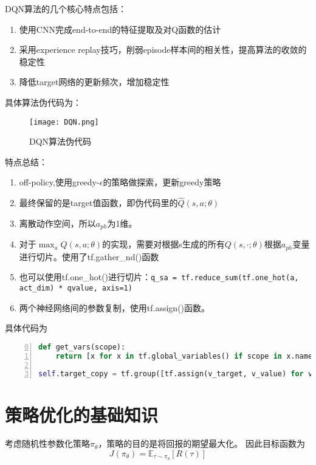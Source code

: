 DQN算法的几个核心特点包括：
\begin{enumerate}
    \item 使用CNN完成end-to-end的特征提取及对Q函数的估计
    \item 采用experience replay技巧，削弱episode样本间的相关性，提高算法的收敛的稳定性
    \item 降低target网络的更新频次，增加稳定性
\end{enumerate}

具体算法伪代码为：
\begin{figure}[htbp]
	\figskip 
	\centering
	\texttt{[image: DQN.png]}	  
	\caption{\label{fig: dqn} DQN算法伪代码}
\end{figure}

特点总结：
\begin{enumerate}
    \item off-policy,使用greedy-$\epsilon$的策略做探索，更新greedy策略
    \item 最终保留的是target值函数，即伪代码里的$\hat{Q}(s,a;\theta)$
    \item 离散动作空间，所以$a_{ph}$为1维。
    \item 对于$\max_a Q(s,a;\theta)$的实现，需要对根据s生成的所有$Q(s,\cdot;\theta)$根据$a_{ph}$变量进行切片。使用了tf.gather\_nd()函数
    \item 也可以使用tf.one_hot()进行切片：\texttt{q_sa = tf.reduce_sum(tf.one_hot(a, act_dim) * qvalue, axis=1)}
    \item 两个神经网络间的参数复制，使用tf.assign()函数。
\end{enumerate}

具体代码为
\begin{lstlisting}[language=python,numbers=left,firstnumber = 0,numberstyle=\tiny,breaklines = true,keywordstyle=\color{blue!70},commentstyle=\color{red!50!green!50!blue!50},frame=shadowbox, rulesepcolor=\color{red!20!green!20!blue!20}]
def get_vars(scope):
    return [x for x in tf.global_variables() if scope in x.name]}

self.target_copy = tf.group([tf.assign(v_target, v_value) for v_value, v_target in zip(get_vars('value'), get_vars('target'))])
\end{lstlisting}






\section{策略优化的基础知识}
考虑随机性参数化策略$\pi_\theta$，策略的目的是将回报的期望最大化。
因此目标函数为
\begin{equation*}
    J(\pi_\theta) = \mathbb{E}_{\tau\sim\pi_\theta}[R(\tau)]
\end{equation*}

